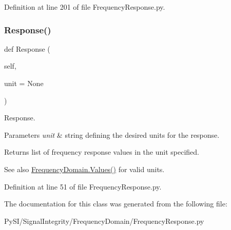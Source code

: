 Definition at line 201 of file Frequency\+Response.\+py.

\mbox{\label{classSignalIntegrity_1_1FrequencyDomain_1_1FrequencyResponse_1_1FrequencyResponse_ab4996cceccaa974296395d3039a9ca2a}} 
\subsubsection{\texorpdfstring{Response()}{Response()}}
{\footnotesize\ttfamily def Response (\begin{DoxyParamCaption}\item[{}]{self,  }\item[{}]{unit = {\ttfamily None} }\end{DoxyParamCaption})}



Response. 


\begin{DoxyParams}{Parameters}
{\em unit} & string defining the desired units for the response. \\
\hline
\end{DoxyParams}
\begin{DoxyReturn}{Returns}
list of frequency response values in the unit specified. 
\end{DoxyReturn}
\begin{DoxySeeAlso}{See also}
\hyperlink{classSignalIntegrity_1_1FrequencyDomain_1_1FrequencyDomain_1_1FrequencyDomain_a3dc7b1e5eba8fb649156094dfdf7a893}{Frequency\+Domain.\+Values()} for valid units. 
\end{DoxySeeAlso}


Definition at line 51 of file Frequency\+Response.\+py.



The documentation for this class was generated from the following file\+:\begin{DoxyCompactItemize}
\item 
Py\+S\+I/\+Signal\+Integrity/\+Frequency\+Domain/Frequency\+Response.\+py\end{DoxyCompactItemize}
